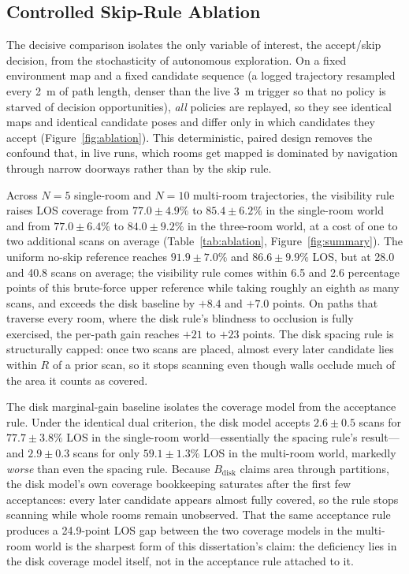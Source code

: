 \subsection{Controlled Skip-Rule Ablation}
\label{subsec:exp-ablation}

The decisive comparison isolates the only variable of interest, the
accept/skip decision, from the stochasticity of autonomous exploration. On a
fixed environment map and a fixed candidate sequence (a logged trajectory
resampled every 2~m of path length, denser than the live 3~m trigger so that no
policy is starved of decision opportunities), \emph{all} policies are
replayed, so they see identical maps and identical candidate poses and differ
only in which candidates they accept (Figure~\ref{fig:ablation}). This
deterministic, paired design removes the confound that, in live runs, which
rooms get mapped is dominated by navigation through narrow doorways rather
than by the skip rule.

Across $N=5$ single-room and $N=10$ multi-room trajectories, the visibility
rule raises LOS coverage from $77.0\pm4.9\%$ to $85.4\pm6.2\%$ in the
single-room world and from $77.0\pm6.4\%$ to $84.0\pm9.2\%$ in the three-room
world, at a cost of one to two additional scans on average
(Table~\ref{tab:ablation}, Figure~\ref{fig:summary}). The uniform no-skip
reference reaches $91.9\pm7.0\%$ and $86.6\pm9.9\%$ LOS, but at 28.0 and 40.8
scans on average; the visibility rule comes within 6.5 and 2.6 percentage
points of this brute-force upper reference while taking roughly an eighth as
many scans, and exceeds the disk baseline by $+8.4$ and $+7.0$ points. On
paths that traverse every room, where the disk rule's blindness to occlusion
is fully exercised, the per-path gain reaches $+21$ to $+23$ points. The disk
spacing rule is structurally capped: once two scans are placed, almost every
later candidate lies within $R$ of a prior scan, so it stops scanning even
though walls occlude much of the area it counts as covered.

The disk marginal-gain baseline isolates the coverage model from the
acceptance rule. Under the identical dual criterion, the disk model accepts
$2.6\pm0.5$ scans for $77.7\pm3.8\%$ LOS in the single-room world---essentially
the spacing rule's result---and $2.9\pm0.3$ scans for only $59.1\pm1.3\%$ LOS
in the multi-room world, markedly \emph{worse} than even the spacing rule.
Because $B_{\mathrm{disk}}$ claims area through partitions, the disk model's
own coverage bookkeeping saturates after the first few acceptances: every
later candidate appears almost fully covered, so the rule stops scanning while
whole rooms remain unobserved. That the same acceptance rule produces a
24.9-point LOS gap between the two coverage models in the multi-room world is
the sharpest form of this dissertation's claim: the deficiency lies in the
disk coverage model itself, not in the acceptance rule attached to it.

